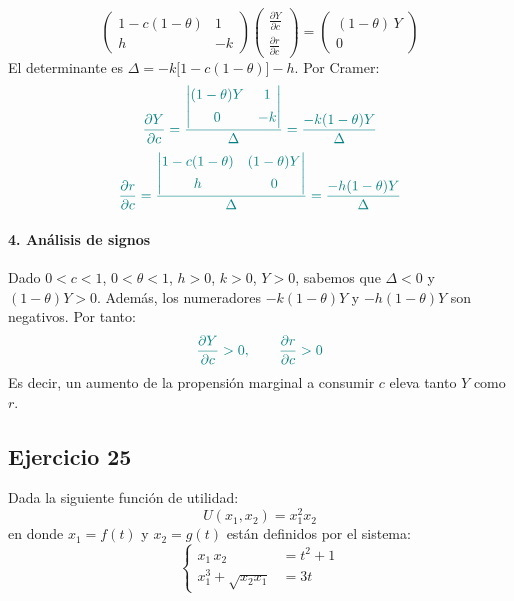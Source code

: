 \documentclass{article}
\begin{document}
\[
\begin{pmatrix}
1 - c(1-\theta) & 1\\[4pt]
h               & -k
\end{pmatrix}
\begin{pmatrix}
\displaystyle \frac{\partial Y}{\partial c}\\[4pt]
\displaystyle \frac{\partial r}{\partial c}
\end{pmatrix}
=
\begin{pmatrix}
(1-\theta)\,Y\\[4pt]
0
\end{pmatrix}
\]
El determinante es \(\Delta = -k\bigl[1-c(1-\theta)\bigr]-h\).  
Por Cramer:
\[
\color{teal}
\frac{\partial Y}{\partial c}
=\frac{
\begin{vmatrix}
(1-\theta)Y & 1\\[4pt]
0           & -k
\end{vmatrix}}{\Delta}
=\frac{-k(1-\theta)Y}{\Delta}
\]
\[
\color{teal}
\frac{\partial r}{\partial c}
=\frac{
\begin{vmatrix}
1 - c(1-\theta) & (1-\theta)Y\\[4pt]
h               & 0
\end{vmatrix}}{\Delta}
=\frac{-h(1-\theta)Y}{\Delta}
\]

\paragraph{4. Análisis de signos}  

Dado \(0<c<1\), \(0<\theta<1\), \(h>0\), \(k>0\), \(Y>0\), sabemos que \(\Delta<0\) y \((1-\theta)Y>0\).  
Además, los numeradores \(-k(1-\theta)Y\) y \(-h(1-\theta)Y\) son negativos.  
Por tanto:
\[
\color{teal}
\frac{\partial Y}{\partial c} > 0,
\qquad
\frac{\partial r}{\partial c} > 0
\]
Es decir, un aumento de la propensión marginal a consumir \(c\) eleva tanto \(Y\) como \(r\).

\newpage
\subsection{Ejercicio 25}

Dada la siguiente función de utilidad:
\[
U(x_1, x_2) = x_1^2 x_2
\]
en donde \(x_1 = f(t)\) y \(x_2 = g(t)\) están definidos por el sistema:
\[
\left\{
\begin{aligned}
x_1\,x_2 &= t^2 + 1 \\
x_1^3 + \sqrt{x_2 x_1} &= 3t
\end{aligned}
\right.
\]
\end{document}
